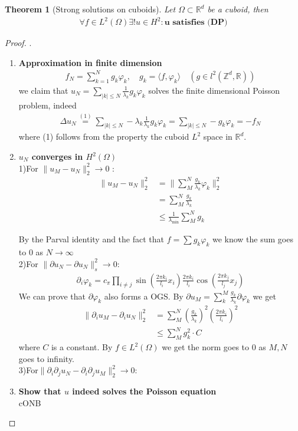 \documentclass[a4paper,11pt,oneside,fleqn]{book}
\newtheorem{theorem}{Theorem}[section]
\theoremstyle{definition}
\theoremstyle{remark}
\begin{document}
\begin{theorem}[Strong solutions on cuboids]
	Let $\Omega \subset \mathbb{R}^d$ be a cuboid, then
	\begin{align*}
		\forall f\in L^2(\Omega) \exists!u \in H^{2}: \textbf{u satisfies (DP)}
	\end{align*}
\end{theorem}
\begin{proof}.
\begin{enumerate}
	\item \textbf{Approximation in finite dimension}
	\begin{align*}
		f_N = \sum^N_{k = 1} g_k \varphi_k, \quad g_k = \langle f, \varphi_k \rangle \quad (g \in l^2(\mathbb{Z}^d, \mathbb{R}))
	\end{align*}
	we claim that $u_N = \sum_{|k| \leq N} \frac{1}{\lambda_k} g_k \varphi_k $ solves the finite dimensional Poisson problem, indeed
	\begin{align*}
		\Delta u_N \overset{(1)}{=} \sum_{|k| \leq N} -\lambda_k \frac{1}{\lambda_k} g_k \varphi_k = \sum_{|k| \leq N} -g_k \varphi_k = -f_N
	\end{align*}
	where (1) follows from the property the cuboid $L^2$ space in $\mathbb{R}^d$.
	\item \textbf{$u_N$ converges in $H^2(\Omega)$}\\
	1)For $\|u_M - u_N\|_2^2 \rightarrow 0$ :
	\begin{align*}
		\|u_M - u_N\|^2_2 &= \| \sum_M^N \frac{g_k}{\lambda_k}\varphi_k\|^2_2\\
		&= \sum_M^N \frac{g_k}{\lambda_k}\\
		&\leq \frac{1}{\lambda_{\min}} \sum_M^N g_k
	\end{align*}
	
	By the Parval identity and the fact that $f = \sum g_k \varphi_k$ we know the sum goes to 0 as $N\rightarrow \infty $ \\
	
	2)For $\|\partial u_N - \partial u_N\|^2_s \rightarrow 0$:
	\begin{align*}
		\partial_i \varphi_k = c_\pi \prod_{i \neq j} \sin(\frac{2\pi k_i}{l_i} x_i) \frac{2\pi k_i}{l_i} \cos (\frac{2\pi k_j }{l_j} x_j)
	\end{align*}
	We can prove that $\partial \varphi_k$ also forms a OGS. By $\partial u_M = \sum^M_k \frac{g_k}{\lambda_k} \partial \varphi_k $ we get
	\begin{align*}
		\|\partial_i u_M - \partial_i u_N\|^2_2 &= \sum_M^N (\frac{g_k}{\lambda_k})^2 (\frac{2\pi k_i}{l_i})^2\\
		&\leq \sum^N_M g_k^2 \cdot C
	\end{align*}
	where $C$ is a constant. By $f\in L^2(\Omega)$ we get the norm goes to 0 as $M, N$ goes to infinity.\\
	3)For$\|\partial_i \partial_j u_N - \partial_i \partial_j u_M\|^2_2 \rightarrow 0$:\\
	\item \textbf{Show that $u$ indeed solves the Poisson equation}\\
	cONB
\end{enumerate}
\end{proof}
\end{document}
